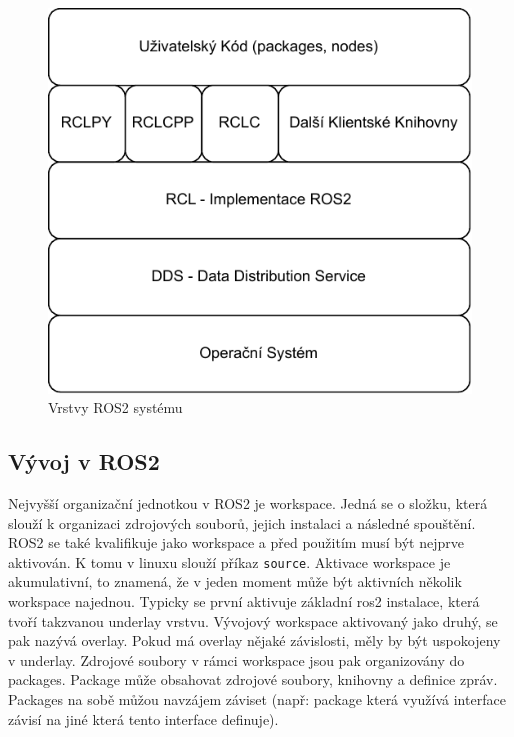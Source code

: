 \begin{figure}[h!]
	\centering
	\includegraphics[scale=0.75]{obrazky-figures/ros_layers.pdf}
	\caption{Vrstvy ROS2 systému}
	\label{}
\end{figure}

\subsection*{Vývoj v ROS2}
Nejvyšší organizační jednotkou v ROS2 je workspace. Jedná se o složku, která slouží k organizaci zdrojových souborů, jejich instalaci a následné spouštění. ROS2 se také kvalifikuje jako workspace a před použitím musí být nejprve aktivován. K tomu v linuxu slouží příkaz \verb|source|. Aktivace workspace je akumulativní, to znamená, že v jeden moment může být aktivních několik workspace najednou. Typicky se první aktivuje základní ros2 instalace, která tvoří takzvanou underlay vrstvu. Vývojový workspace aktivovaný jako druhý, se pak nazývá overlay. Pokud má overlay nějaké závislosti, měly by být uspokojeny v underlay.
Zdrojové soubory v rámci workspace jsou pak organizovány do packages. Package může obsahovat zdrojové soubory, knihovny a definice zpráv. Packages na sobě můžou navzájem záviset (např: package která využívá interface závisí na jiné která tento interface definuje). \cite{ros2_introduction}

